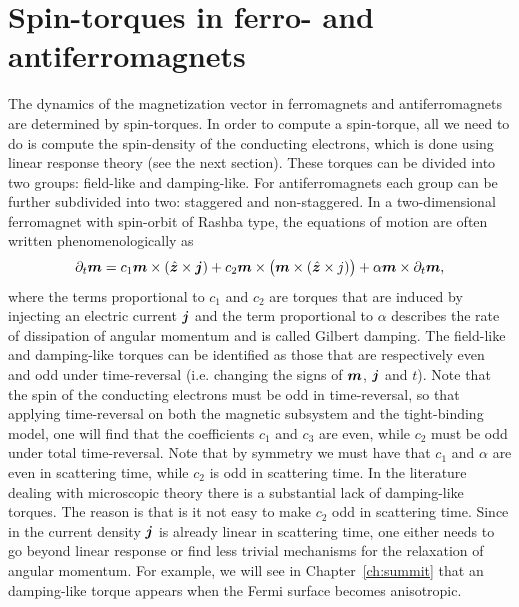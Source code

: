 \section{Spin-torques in ferro- and antiferromagnets}
The dynamics of the magnetization vector in ferromagnets and antiferromagnets are determined by spin-torques. In order to compute a spin-torque, all we need to do is compute the spin-density of the conducting electrons, which is done using linear response theory (see the next section).  
 These torques can be divided into two groups: field-like and damping-like. For antiferromagnets each group can be further subdivided into two: staggered and non-staggered. In a two-dimensional ferromagnet with spin-orbit of Rashba type, the equations of motion are often written phenomenologically as
\begin{equation}
    \partial_t \boldsymbol{m} = c_1 \boldsymbol{m}\times (\hat{\boldsymbol{z}}\times\boldsymbol{j}) + c_2 \boldsymbol{m}\times\big(\boldsymbol{m}\times (\hat{\boldsymbol{z}}\times{j})\big) + \alpha \boldsymbol{m}\times \partial_t \boldsymbol{m},
    \label{eq:sd:ferro}
\end{equation}
where the terms proportional to $c_1$ and $c_2$ are torques that are induced by injecting an electric current $\boldsymbol{j}$ and the term proportional to $\alpha$ describes the rate of dissipation of angular momentum and is called Gilbert damping. The field-like and damping-like torques can be identified as those that are respectively even and odd under time-reversal (i.e. changing the signs of $\boldsymbol{m}$, $\boldsymbol{j}$ and $t$). Note that the spin of the conducting electrons must be odd in time-reversal, so that applying time-reversal on both the magnetic subsystem and the tight-binding model, one will find that the coefficients $c_1$ and $c_3$ are even, while $c_2$ must be odd under total time-reversal. Note that by symmetry we must have that $c_1$ and $\alpha$ are even in scattering time, while $c_2$ is odd in scattering time. In the literature dealing with microscopic theory there is a substantial lack of damping-like torques. The reason is that is it not easy to make $c_2$ odd in scattering time. Since in the current density $\boldsymbol{j}$ is already linear in scattering time, one either needs to go beyond linear response or find less trivial mechanisms for the relaxation of angular momentum. For example, we will see in Chapter~\ref{ch:summit} that an damping-like torque appears when the Fermi surface becomes anisotropic. 

